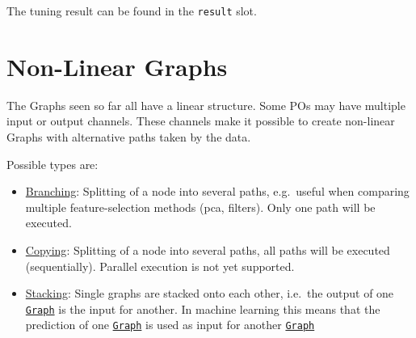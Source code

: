 \documentclass[]{scrbook}
\newenvironment{Shaded}{\begin{snugshade}}{\end{snugshade}}
\newcommand{\KeywordTok}[1]{\textcolor[rgb]{0.13,0.29,0.53}{\textbf{#1}}}
\newcommand{\NormalTok}[1]{#1}
\newcommand{\OperatorTok}[1]{\textcolor[rgb]{0.81,0.36,0.00}{\textbf{#1}}}
\newcommand{\StringTok}[1]{\textcolor[rgb]{0.31,0.60,0.02}{#1}}
\providecommand{\tightlist}{%
  \setlength{\itemsep}{0pt}\setlength{\parskip}{0pt}}
\renewenvironment{Shaded} {\begin{snugshade}\small} {\end{snugshade}}
\begin{document}
\begin{Shaded}
\end{Shaded}

The tuning result can be found in the \texttt{result} slot.

\begin{Shaded}
\end{Shaded}

\hypertarget{pipe-nonlinear}{%
\section{Non-Linear Graphs}\label{pipe-nonlinear}}

The Graphs seen so far all have a linear structure.
Some POs may have multiple input or output channels.
These channels make it possible to create non-linear Graphs with alternative paths taken by the data.

Possible types are:

\begin{itemize}
\tightlist
\item
  \protect\hyperlink{pipe-model-ensembles-branching}{Branching}:
  Splitting of a node into several paths, e.g.~useful when comparing multiple feature-selection methods (pca, filters).
  Only one path will be executed.
\item
  \protect\hyperlink{pipe-model-ensembles-copying}{Copying}:
  Splitting of a node into several paths, all paths will be executed (sequentially).
  Parallel execution is not yet supported.
\item
  \protect\hyperlink{pipe-model-ensembles-stacking}{Stacking}:
  Single graphs are stacked onto each other, i.e.~the output of one \href{https://mlr3pipelines.mlr-org.com/reference/Graph.html}{\texttt{Graph}} is the input for another.
  In machine learning this means that the prediction of one \href{https://mlr3pipelines.mlr-org.com/reference/Graph.html}{\texttt{Graph}} is used as input for another \href{https://mlr3pipelines.mlr-org.com/reference/Graph.html}{\texttt{Graph}}
\end{itemize}
\end{document}

